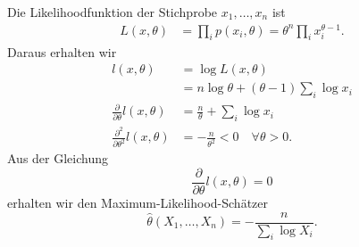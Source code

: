 \solution Die Likelihoodfunktion der Stichprobe $x_1,\ldots,x_n$ ist
\begin{align*}
    L(x,\theta) &= \prod_i p(x_i, \theta) = \theta^n \prod_i x_i^{\theta-1}.
\end{align*}
Daraus erhalten wir
\begin{align*}
    l(x,\theta) &= \log L(x,\theta) \\
    &= n \log \theta + (\theta-1) \sum_{i}^{} \log x_i \\
    \frac{\partial}{\partial\theta} l(x,\theta) &= \frac{n}{\theta} + \sum_{i}^{} \log x_i \\
    \frac{\partial^2}{\partial \theta^2} l(x,\theta) &= -\frac{n}{\theta^2} < 0 \quad \forall\theta>0.
\end{align*}
Aus der Gleichung
\begin{equation*}
    \frac{\partial}{\partial\theta} l(x,\theta) = 0
\end{equation*}
erhalten wir den Maximum-Likelihood-Schätzer
\begin{equation*}
    \hat \theta(X_1,\ldots,X_n) = - \frac{n}{\sum_{i}^{} \log X_i}.
\end{equation*}

